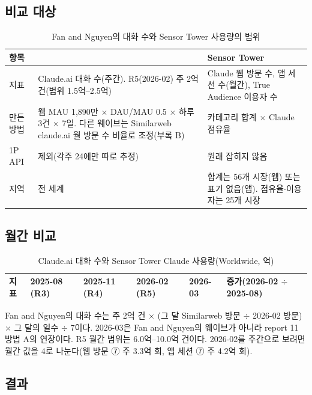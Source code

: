 \documentclass[11pt]{article}
\begin{document}
\subsection{비교 대상}

\begin{longtable}{L{2.6cm}L{6.4cm}L{6.4cm}}
\caption{Fan and Nguyen의 대화 수와 Sensor Tower 사용량의 범위}\label{tab:fan-scope}\\
\toprule
항목 & \citeauthor{fan-2026-aggregate-gains-from-ai} & Sensor Tower \\
\midrule
\endhead
지표 & Claude.ai 대화 수(주간). R5(2026-02) 주 2억 건(범위 1.5억--2.5억) & Claude 웹 방문 수, 앱 세션 수(월간), True Audience 이용자 수 \\
만든 방법 & 웹 MAU 1,890만 $\times$ DAU/MAU 0.5 $\times$ 하루 3건 $\times$ 7일. 다른 웨이브는 Similarweb claude.ai 월 방문 수 비율로 조정(부록 B) & 카테고리 합계 $\times$ Claude 점유율 \\
1P API & 제외(각주 24에만 따로 추정) & 원래 잡히지 않음 \\
지역 & 전 세계 & 합계는 56개 시장(웹) 또는 표기 없음(앱). 점유율$\cdot$이용자는 25개 시장 \\
\bottomrule
\end{longtable}

\subsection{월간 비교}

\begin{longtable}{L{5.6cm}R{1.7cm}R{1.7cm}R{1.7cm}R{1.7cm}R{2.4cm}}
\caption{Claude.ai 대화 수와 Sensor Tower Claude 사용량(Worldwide, 억)}\label{tab:fan}\\
\toprule
지표 & 2025-08 (R3) & 2025-11 (R4) & 2026-02 (R5) & 2026-03 & 증가(2026-02 $\div$ 2025-08) \\
\midrule
\endhead

\bottomrule
\end{longtable}

Fan and Nguyen의 대화 수는 주 2억 건 $\times$ (그 달 Similarweb 방문 $\div$ 2026-02 방문) $\times$ 그 달의 일수 $\div$ 7이다. 2026-03은 Fan and Nguyen의 웨이브가 아니라 report 11 방법 A의 연장이다. R5 월간 범위는 6.0억--10.0억 건이다. 2026-02를 주간으로 보려면 월간 값을 4로 나눈다(웹 방문 ⑦ 주 3.3억 회, 앱 세션 ⑦ 주 4.2억 회).

\subsection{결과}
\end{document}
